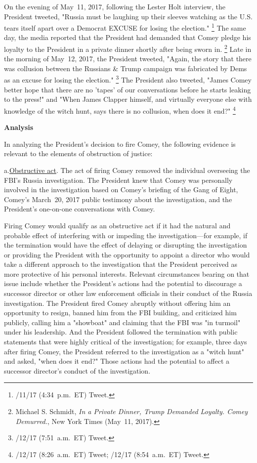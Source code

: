 On the evening of May~11, 2017, following the Lester Holt interview, the President tweeted, "Russia must be laughing up their sleeves watching as the U.S. tears itself apart over a Democrat EXCUSE for losing the election."%
\footnote{/11/17 (4:34~p.m.~ET) Tweet.}
The same day, the media reported that the President had demanded that Comey pledge his loyalty to the President in a private dinner shortly after being sworn in.%
\footnote{Michael S. Schmidt, \textit{In a Private Dinner, Trump Demanded Loyalty. Comey Demurred.}, New York Times (May~11, 2017).}
Late in the morning of May~12, 2017, the President tweeted, "Again, the story that there was collusion between the Russians \& Trump campaign was fabricated by Dems as an excuse for losing the election."%
\footnote{/12/17 (7:51~a.m.~ET) Tweet.}
The President also tweeted, "James Comey better hope that there are no 'tapes' of our conversations before he starts leaking to the press!" and "When James Clapper himself, and virtually everyone else with knowledge of the witch hunt, says there is no collusion, when does it end?"%
\footnote{/12/17 (8:26~a.m.~ET) Tweet;
/12/17 (8:54~a.m.~ET) Tweet.}

\begin{center}
\textbf{Analysis}
\end{center}

In analyzing the President's decision to fire Comey, the following evidence is relevant to the elements of obstruction of justice:

a.\qquad\underline{Obstructive act}.
The act of firing Comey removed the individual overseeing the FBI's Russia investigation.
The President knew that Comey was personally involved in the investigation based on Comey's briefing of the Gang of Eight, Comey's March~20, 2017 public testimony about the investigation, and the President's one-on-one conversations with Comey.

Firing Comey would qualify as an obstructive act if it had the natural and probable effect of interfering with or impeding the investigation---for example, if the termination would have the effect of delaying or disrupting the investigation or providing the President with the opportunity to appoint a director who would take a different approach to the investigation that the President perceived as more protective of his personal interests.
Relevant circumstances bearing on that issue include whether the President's actions had the potential to discourage a successor director or other law enforcement officials in their conduct of the Russia investigation.
The President fired Comey abruptly without offering him an opportunity to resign, banned him from the FBI building, and criticized him publicly, calling him a "showboat" and claiming that the FBI was "in turmoil" under his leadership.
And the President followed the termination with public statements that were highly critical of the investigation;
for example, three days after firing Comey, the President referred to the investigation as a "witch hunt" and asked, "when does it end?"
Those actions had the potential to affect a successor director's conduct of the investigation.

